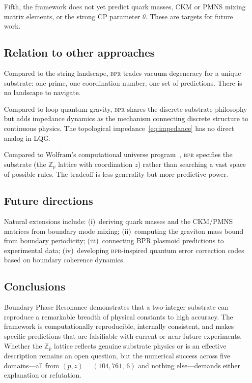 \documentclass[aps,prd,twocolumn,superscriptaddress,longbibliography,nofootinbib]{revtex4-2}
\newcommand{\Zp}{\mathbb{Z}_p}
\newcommand{\bpr}{\textsc{bpr}}
\begin{document}
Fifth, the framework does not yet predict quark masses, CKM or PMNS
mixing matrix elements, or the strong CP parameter $\theta$.  These
are targets for future work.

\subsection{Relation to other approaches}

Compared to the string landscape, \bpr{} trades vacuum degeneracy
for a unique substrate: one prime, one coordination number, one set
of predictions.  There is no landscape to navigate.

Compared to loop quantum gravity, \bpr{} shares the
discrete-substrate philosophy but adds impedance dynamics as the
mechanism connecting discrete structure to continuous physics.  The
topological impedance~\eqref{eq:impedance} has no direct analog in
LQG.

Compared to Wolfram's computational universe
program~\cite{Wolfram2020}, \bpr{} specifies the substrate (the
$\Zp$ lattice with coordination $z$) rather than searching a vast
space of possible rules.  The tradeoff is less generality but more
predictive power.

\subsection{Future directions}

Natural extensions include: (i)~deriving quark masses and the
CKM/PMNS matrices from boundary mode mixing; (ii)~computing the
graviton mass bound from boundary periodicity; (iii)~connecting BPR
plasmoid predictions to experimental data; (iv)~developing
\bpr{}-inspired quantum error correction codes based on boundary
coherence dynamics.

\subsection{Conclusions}

Boundary Phase Resonance demonstrates that a two-integer substrate
can reproduce a remarkable breadth of physical constants to high
accuracy.  The framework is computationally reproducible, internally
consistent, and makes specific predictions that are falsifiable with
current or near-future experiments.  Whether the $\Zp$ lattice
reflects genuine substrate physics or is an effective description
remains an open question, but the numerical success across five
domains---all from $(p, z) = (104{,}761,\, 6)$ and nothing
else---demands either explanation or refutation.
\end{document}
